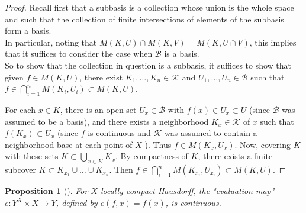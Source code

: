 \documentclass[reqno]{amsart}
\newtheorem{proposition}[theorem]{Proposition}
\theoremstyle{definition}
\theoremstyle{remark}
\begin{document}
\begin{proof}
    Recall first that a subbasis is a collection whose
    union is the whole space and such that the
    collection of finite intersections of elements of the
    subbasis form a basis.\\
    In particular, noting that
    $M \left( K, U \right) \cap M\left( K,V \right) =
    M\left( K, U \cap V \right) $, this implies that it
    suffices to consider the case when $\mathcal{B}$ is
    a basis.\\
    So to show that the collection in question
    is a subbasis, it suffices to show that
    given $f \in M(K,U)$, there exist
    $K_1, \ldots,K_n \in \mathcal{K}$ and
    $U_1, \ldots, U_n \in \mathcal{B}$ such that
    $f \in \bigcap_{i=1}^{n} M\left( K_i,U_i \right) 
    \subset M\left( K,U \right) $.

    For each $x \in K$, there is an open
    set $U_x \in \mathcal{B}$ with
    $f(x) \in U_x \subset U$ (since $\mathcal{B}$ was
    assumed to be a basis), and there
    exists a neighborhood $K_x \in \mathcal{K}$  of
    $x$ such that $f(K_x) \subset U_x$ (since
    $f$ is continuous and $\mathcal{K}$ was assumed
    to contain a neighborhood base at each point of $X$ ).
    Thus $f \in M\left( K_x, U_x \right) $.
    Now, covering $K$ with these sets
    $K \subset \bigcup_{x \in K} K_{x}$. By 
    compactness of $K$, there exists a finite subcover
    $K \subset K_{x_1} \cup \ldots \cup K_{x_n}$. Then
    $f \in \bigcap_{i=1}^{n} M\left( K_{x_i}, U_{x_i} \right) 
    \subset M\left( K,U \right) $.
\end{proof}

\begin{proposition}[]\label{Prop:SJUSIO12}
    For $X$ locally compact Hausdorff, the
    "evaluation map" $e\colon Y^{X} \times X
    \to Y$, defined by $e\left( f,x \right) =
    f(x)$, is continuous.
\end{proposition}
\end{document}
